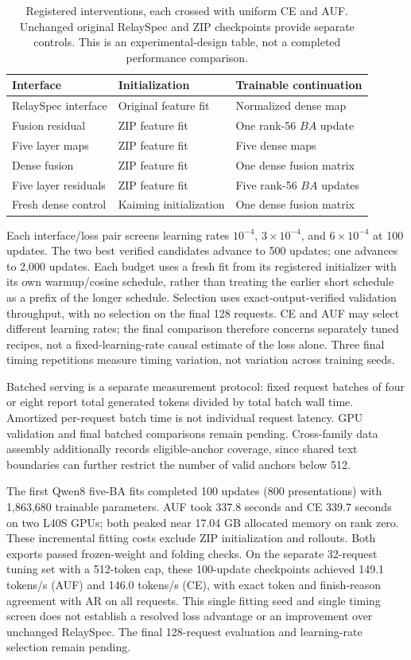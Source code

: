 \documentclass{article}
\begin{document}
\begin{table}[t]
\centering\small
\begin{tabular}{lll}
\toprule
Interface & Initialization & Trainable continuation \\
\midrule
RelaySpec interface & Original feature fit & Normalized dense map \\
Fusion residual & ZIP feature fit & One rank-56 $BA$ update \\
Five layer maps & ZIP feature fit & Five dense maps \\
Dense fusion & ZIP feature fit & One dense fusion matrix \\
Five layer residuals & ZIP feature fit & Five rank-56 $BA$ updates \\
Fresh dense control & Kaiming initialization & One dense fusion matrix \\
\bottomrule
\end{tabular}
\caption{Registered interventions, each crossed with uniform CE and AUF.
Unchanged original RelaySpec and ZIP checkpoints provide separate controls.
This is an experimental-design table, not a completed performance comparison.}
\end{table}

Each interface/loss pair screens learning rates $10^{-4}$, $3\times10^{-4}$,
and $6\times10^{-4}$ at 100 updates. The two best verified candidates advance
to 500 updates; one advances to 2,000 updates. Each budget uses a fresh fit
from its registered initializer with its own warmup/cosine schedule, rather
than treating the earlier short schedule as a prefix of the longer schedule.
Selection uses exact-output-verified validation throughput, with no selection
on the final 128 requests. CE and AUF may select different learning rates;
the final comparison therefore concerns separately tuned recipes, not a
fixed-learning-rate causal estimate of the loss alone. Three final timing
repetitions measure timing variation, not variation across training seeds.

Batched serving is a separate measurement protocol: fixed request batches of
four or eight report total generated tokens divided by total batch wall time.
Amortized per-request batch time is not individual request latency. GPU
validation and final batched comparisons remain pending. Cross-family data
assembly additionally records eligible-anchor coverage, since shared text
boundaries can further restrict the number of valid anchors below 512.

The first Qwen8 five-BA fits completed 100 updates (800 presentations) with
1,863,680 trainable parameters. AUF took 337.8 seconds and CE 339.7 seconds
on two L40S GPUs; both peaked near 17.04 GB allocated memory on rank zero.
These incremental fitting costs exclude ZIP initialization and rollouts.
Both exports passed frozen-weight and folding checks. On the separate
32-request tuning set with a 512-token cap, these 100-update checkpoints
achieved 149.1 tokens/s (AUF) and 146.0 tokens/s (CE), with exact token and
finish-reason agreement with AR on all requests. This single fitting seed
and single timing screen does not establish a resolved loss advantage or
an improvement over unchanged RelaySpec. The final 128-request evaluation
and learning-rate selection remain pending.
\end{document}
